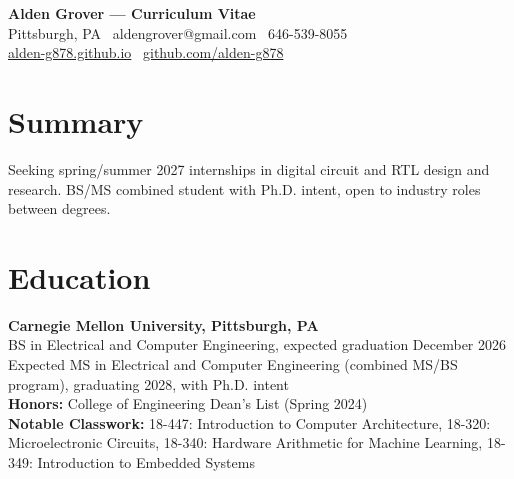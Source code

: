 \documentclass[10pt,letterpaper]{article}
\newcommand{\cvsection}[1]{%
  \vspace*{-11pt}%
  \section*{#1}%
  \vspace*{-10pt}%
}
\begin{document}
\pdfinterwordspaceon

%
%
\begin{center}
  {\Large\bfseries Alden Grover — Curriculum Vitae}\\[2pt]
  Pittsburgh, PA \textbullet\ aldengrover@gmail.com \textbullet\ 646-539-8055\\
  \href{https://alden-g878.github.io}{alden-g878.github.io}
  \textbullet\
  \href{https://github.com/alden-g878}{github.com/alden-g878}
\end{center}

\cvsection{Summary}
Seeking spring/summer 2027 internships in digital circuit and RTL design and
research. BS/MS combined student with Ph.D. intent, open to industry roles
between degrees.

\cvsection{Education}
\textbf{Carnegie Mellon University, Pittsburgh, PA} \\
BS in Electrical and Computer Engineering, expected graduation December 2026 \\
Expected MS in Electrical and Computer Engineering (combined MS/BS program),
graduating 2028, with Ph.D. intent \\
\textbf{Honors:} College of Engineering Dean's List (Spring 2024) \\
\textbf{Notable Classwork:} 18-447: Introduction to Computer Architecture, 18-320: Microelectronic Circuits, 18-340: Hardware Arithmetic
    for Machine Learning, 18-349: Introduction to Embedded Systems
\end{document}
